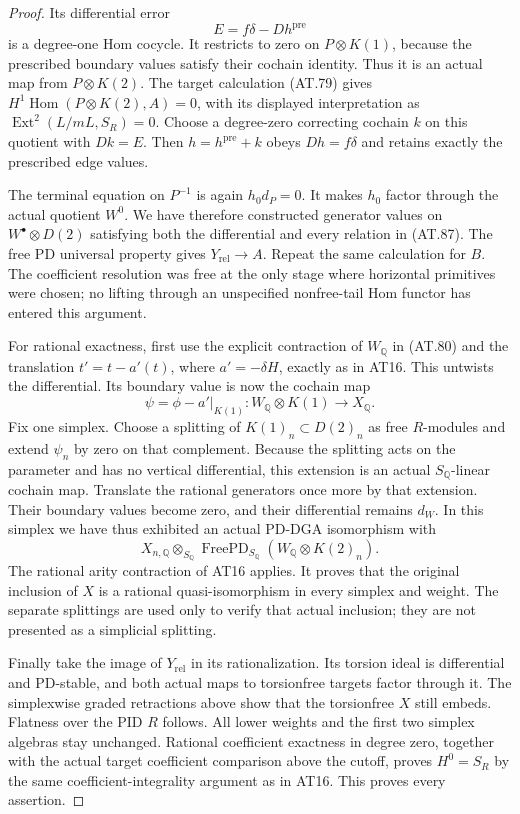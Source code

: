 \begin{proof}
Its differential error
\[
                 E=f\delta-Dh^{\mathrm{pre}}
 \tag{AT.88}
\]
is a degree-one Hom cocycle.
It restricts to zero on $P\otimes K(1)$, because
the prescribed boundary values satisfy their
cochain identity. Thus it is an actual map from
$P\otimes K(2)$.
The target calculation \textup{(AT.79)} gives
$H^1\operatorname{Hom}(P\otimes K(2),A)=0$,
with its displayed interpretation as
$\operatorname{Ext}^2(L/mL,S_R)=0$.
Choose a degree-zero correcting cochain $k$
on this quotient with $Dk=E$.
Then $h=h^{\mathrm{pre}}+k$ obeys
$Dh=f\delta$ and retains exactly the prescribed
edge values.

The terminal equation on $P^{-1}$ is again
$h_0d_P=0$. It makes $h_0$ factor through the
actual quotient $W^0$.
We have therefore constructed generator values
on $W^\bullet\otimes D(2)$ satisfying both the
differential and every relation in
\textup{(AT.87)}.
The free PD universal property gives
$Y_{\mathrm{rel}}\to A$.
Repeat the same calculation for $B$.
The coefficient resolution was free at the only
stage where horizontal primitives were chosen;
no lifting through an unspecified nonfree-tail
Hom functor has entered this argument.

For rational exactness, first use the explicit
contraction of $W_{\mathbb Q}$ in \textup{(AT.80)}
and the translation $t'=t-a'(t)$, where
$a'=-\delta H$, exactly as in AT16.
This untwists the differential.
Its boundary value is now the cochain map
\[
               \psi=\phi-a'|_{K(1)}
              :W_{\mathbb Q}\otimes K(1)\to X_{\mathbb Q}.
\]
Fix one simplex.
Choose a splitting of $K(1)_n\subset D(2)_n$
as free $R$-modules and extend $\psi_n$ by zero
on that complement.
Because the splitting acts on the parameter and
has no vertical differential, this extension
is an actual $S_{\mathbb Q}$-linear cochain map.
Translate the rational generators once more by
that extension. Their boundary values become zero,
and their differential remains $d_W$.
In this simplex we have thus exhibited an actual
PD-DGA isomorphism with
\[
 X_{n,\mathbb Q}\otimes_{S_{\mathbb Q}}
    \operatorname{FreePD}_{S_{\mathbb Q}}
                  (W_{\mathbb Q}\otimes K(2)_n).
 \tag{AT.89}
\]
The rational arity contraction of AT16 applies.
It proves that the original inclusion of $X$
is a rational quasi-isomorphism in every simplex
and weight. The separate splittings are used
only to verify that actual inclusion; they are
not presented as a simplicial splitting.

Finally take the image of $Y_{\mathrm{rel}}$
in its rationalization.
Its torsion ideal is differential and PD-stable,
and both actual maps to torsionfree targets
factor through it.
The simplexwise graded retractions above show
that the torsionfree $X$ still embeds.
Flatness over the PID $R$ follows.
All lower weights and the first two simplex
algebras stay unchanged.
Rational coefficient exactness in degree zero,
together with the actual target coefficient
comparison above the cutoff, proves $H^0=S_R$
by the same coefficient-integrality argument
as in AT16.
This proves every assertion.
\end{proof}

